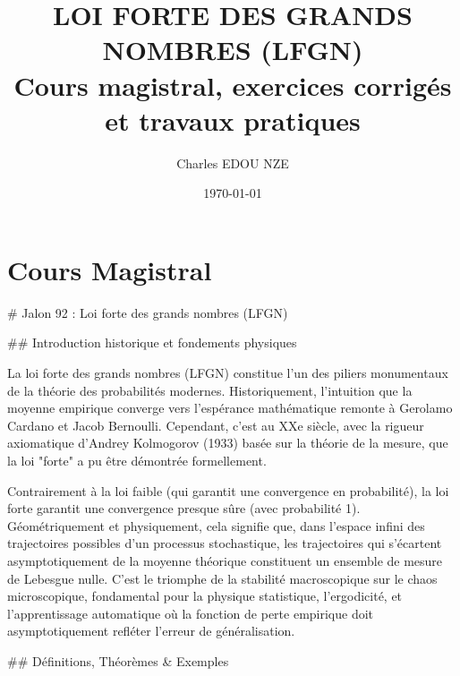 \documentclass[11pt,a4paper]{article}
\title{\Huge LOI FORTE DES GRANDS NOMBRES (LFGN) \\ \large Cours magistral, exercices corrigés et travaux pratiques}
\author{\Large Charles EDOU NZE}
\date{\today}
\begin{document}
\maketitle
\tableofcontents
\newpage

\part{Cours Magistral}

\# Jalon 92 : Loi forte des grands nombres (LFGN)

\#\# Introduction historique et fondements physiques

La loi forte des grands nombres (LFGN) constitue l'un des piliers monumentaux de la théorie des probabilités modernes. Historiquement, l'intuition que la moyenne empirique converge vers l'espérance mathématique remonte à Gerolamo Cardano et Jacob Bernoulli. Cependant, c'est au XXe siècle, avec la rigueur axiomatique d'Andrey Kolmogorov (1933) basée sur la théorie de la mesure, que la loi "forte" a pu être démontrée formellement.

Contrairement à la loi faible (qui garantit une convergence en probabilité), la loi forte garantit une convergence presque sûre (avec probabilité 1). Géométriquement et physiquement, cela signifie que, dans l'espace infini des trajectoires possibles d'un processus stochastique, les trajectoires qui s'écartent asymptotiquement de la moyenne théorique constituent un ensemble de mesure de Lebesgue nulle. C'est le triomphe de la stabilité macroscopique sur le chaos microscopique, fondamental pour la physique statistique, l'ergodicité, et l'apprentissage automatique où la fonction de perte empirique doit asymptotiquement refléter l'erreur de généralisation.


\#\# Définitions, Théorèmes \& Exemples
\end{document}
